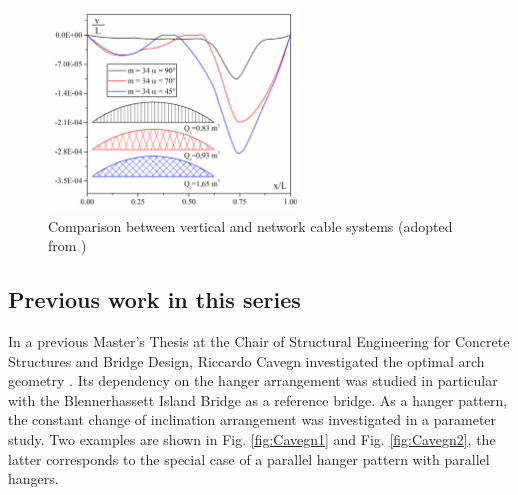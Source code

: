 \begin{figure}[H]
    \centering
    \includegraphics[width=0.6\textwidth]{Pictures/BrunoArrangements.PNG}
    \caption{Comparison between vertical and network cable systems (adopted from \citep{Bruno})}
    \label{fig:Bruno2}
\end{figure}


\newpage
\subsection{Previous work in this series}\label{sec:rev_prev}
In a previous Master's Thesis at the Chair of Structural Engineering for Concrete Structures and Bridge Design, Riccardo Cavegn investigated the optimal arch geometry \citep{Cavegn}. Its dependency on the hanger arrangement was studied in particular with the Blennerhassett Island Bridge as a reference bridge. As a hanger pattern, the constant change of inclination arrangement was investigated in a parameter study. Two examples are shown in Fig. \ref{fig:Cavegn1} and Fig. \ref{fig:Cavegn2}, the latter corresponds to the special case of a parallel hanger pattern with parallel hangers.

